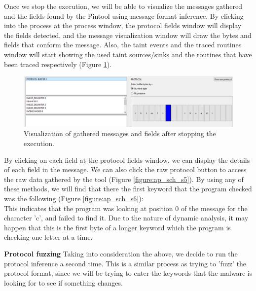 \documentclass[conference]{IEEEtran}
\begin{document}
Once we stop the execution, we will be able to visualize the messages gathered
and the fields found by the Pintool using message format inference. By clicking
into the process at the process window, the protocol fields window will display
the fields detected, and the message visualization window will draw the bytes
and fields that conform the message. Also, the taint events and the traced
routines window will start showing the used taint sources/sinks and the
routines that have been traced respectively (Figure \ref{figure:ap_sch_s4}).

\begin{figure}[htbp]
    \centerline{\includegraphics[width=1.0\columnwidth]{images/sch_s4.png}}
    \caption{Visualization of gathered messages and fields after stopping the execution.}
    \label{figure:ap_sch_s4}
\end{figure}

By clicking on each field at the protocol fields window, we can display the
details of each field in the message. We can also click the raw protocol button
to access the raw data gathered by the tool (Figure \ref{figure:ap_sch_s5}). By
using any of these methods, we will find that there the first keyword that the
program checked was the following (Figure \ref{figure:ap_sch_s6}):
\noindent{}\\%

This indicates that the program was looking at position 0 of the message for
the character 'c', and failed to find it. Due to the nature of dynamic analysis,
it may happen that this is the first byte of a longer keyword which the program
is checking one letter at a time.

\textbf{Protocol fuzzing}
Taking into consideration the above, we decide to run the protocol inference a second time. This is a similar
process as trying to 'fuzz' the protocol format, since we will be trying to enter the keywords that the
malware is looking for to see if something changes.
\end{document}
